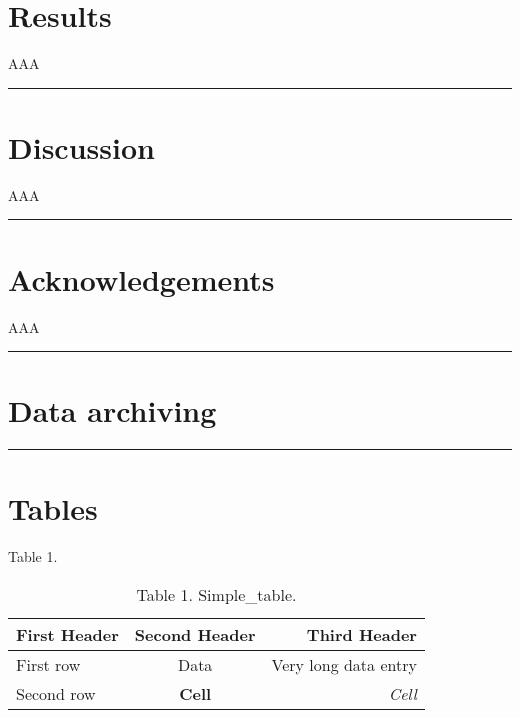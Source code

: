 \section{Results}
\label{results}

AAA

\begin{center}\rule{3in}{0.4pt}\end{center}


\section{Discussion}
\label{discussion}

AAA 

\begin{center}\rule{3in}{0.4pt}\end{center}


\section{Acknowledgements}
\label{acknowledgements}

AAA 

\begin{center}\rule{3in}{0.4pt}\end{center}


\section{Data archiving}
\label{dataarchiving}

\begin{center}\rule{3in}{0.4pt}\end{center}


\section{Tables}
\label{tables}

Table 1. 

\begin{table}[htbp]
\begin{minipage}{\linewidth}
\setlength{\tymax}{0.5\linewidth}
\centering
\small
\caption{Table 1. Simple\_table.}
\label{table1.simple_table.}
\begin{tabulary}{\textwidth}{@{}LCR@{}} \toprule
First Header&Second Header&Third Header\\
\midrule
First row&Data&Very long data entry\\
Second row&\textbf{Cell}&\emph{Cell}\\

\bottomrule

\end{tabulary}
\end{minipage}
\end{table}

